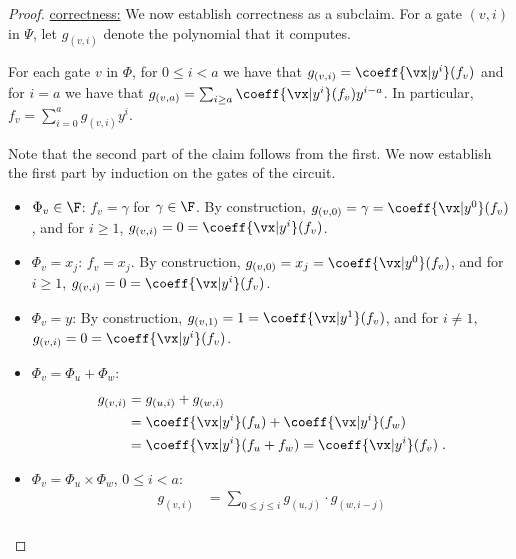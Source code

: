 \documentclass{toc}
\begin{document}
\begin{proof}
        \uline{correctness:} We now establish correctness as a subclaim.  For a gate $(v,i)$ in $\Psi$, let $g_{(v,i)}$ denote the polynomial that it computes.

        \begin{subclaim}
                For each gate $v$ in $\Phi$, for $0\le i<a$ we have that $g_{(v,i)}=\coeff{\vx|y^i}(f_v)$ and for $i=a$ we have that $g_{(v,a)}=\sum_{i\ge a} \coeff{\vx|y^i}(f_v)y^{i-a}$.  In particular, $f_v=\sum_{i=0}^a g_{(v,i)}y^i$.
        \end{subclaim}
        \begin{subproof}
                Note that the second part of the claim follows from the first. We now establish the first part by induction on the gates of the circuit.

                \begin{itemize}
                        \item $\Phi_v\in\F$: $f_v=\gamma$ for $\gamma\in\F$. By construction, $g_{(v,0)}=\gamma=\coeff{\vx|y^0}(f_v)$, and for $i\ge1$, $g_{(v,i)}=0=\coeff{\vx|y^i}(f_v)$.
                        \item $\Phi_v=x_j$: $f_v=x_j$. By construction, $g_{(v,0)}=x_j=\coeff{\vx|y^0}(f_v)$, and for $i\ge1$, $g_{(v,i)}=0=\coeff{\vx|y^i}(f_v)$.
                        \item $\Phi_v=y$: By construction, $g_{(v,1)}=1=\coeff{\vx|y^1}(f_v)$, and for $i\ne 1$, $g_{(v,i)}=0=\coeff{\vx|y^i}(f_v)$.
                        \item $\Phi_v=\Phi_u+\Phi_w$:
                                \begin{align*}
                                        g_{(v,i)}
                                        &=g_{(u,i)}+g_{(w,i)}\\
                                        &=\coeff{\vx|y^i}(f_u)+\coeff{\vx|y^i}(f_w)\\
                                        &=\coeff{\vx|y^i}(f_u+f_w)
                                        =\coeff{\vx|y^i}(f_v)
                                        \;.
                                \end{align*}
                        \item $\Phi_v=\Phi_u\times\Phi_w$, $0\le i<a$:
                                \begin{align*}
                                        g_{(v,i)}
                                        &=\sum_{0\le j\le i} g_{(u,j)}\cdot g_{(w,i-j)}\\

\end{align*}
\end{itemize}
\end{subproof}
\end{proof}
\end{document}
